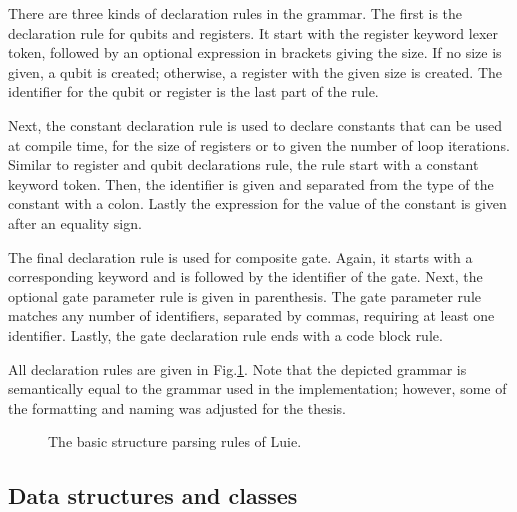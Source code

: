 There are three kinds of declaration rules in the grammar. The first is the declaration rule for qubits and registers. It start with the register keyword lexer token, followed by an optional expression in brackets giving the size. If no size is given, a qubit is created; otherwise, a register with the given size is created. The identifier for the qubit or register is the last part of the rule. 

Next, the constant declaration rule is used to declare constants that can be used at compile time, \eg for the size of registers or to given the number of loop iterations. Similar to register and qubit declarations rule, the rule start with a constant keyword token. Then, the identifier is given and separated from the type of the constant with a colon. Lastly the expression for the value of the constant is given after an equality sign.

The final declaration rule is used for composite gate. Again, it starts with a corresponding keyword and is followed by the identifier of the gate. Next, the optional gate parameter rule is given in parenthesis. The gate parameter rule matches any number of identifiers, separated by commas, requiring at least one identifier. Lastly, the gate declaration rule ends with a code block rule. 

All declaration rules are given in Fig.\ref{fig:implementation_grammarDeclarations}. Note that the depicted grammar is semantically equal to the grammar used in the implementation; however, some of the formatting and naming was adjusted for the thesis.
\begin{figure}[htp]
    \centering
    
    \caption{The basic structure parsing rules of Luie.}
    \label{fig:implementation_grammarDeclarations}
\end{figure}

\subsection{Data structures and classes}
